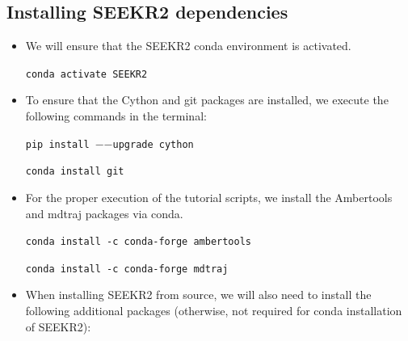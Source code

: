 \documentclass[9pt,training,pubversion]{livecoms}
\begin{document}
\subsection{Installing SEEKR2 dependencies}
\vspace{2mm}

\begin{itemize}

\item We will ensure that the SEEKR2 conda environment is activated.

\begin{tcolorbox}[colback=black!8!white, colframe=black!50!black, fontlower=\tiny, left=2pt, right=2pt, top=2pt, bottom=2pt] 
\texttt{conda activate SEEKR2}
\end{tcolorbox}

\item To ensure that the Cython and git packages are installed, we execute the following commands in the terminal:

\begin{tcolorbox}[colback=black!8!white, colframe=black!50!black, fontlower=\tiny, left=2pt, right=2pt, top=2pt, bottom=2pt] 
\texttt{pip install $-$$-$upgrade cython}
\end{tcolorbox}

\begin{tcolorbox}[colback=black!8!white, colframe=black!50!black, fontlower=\tiny, left=2pt, right=2pt, top=2pt, bottom=2pt] 
\texttt{conda install git}
\end{tcolorbox}

\item For the proper execution of the tutorial scripts, we install the Ambertools and mdtraj packages via conda. 

\begin{tcolorbox}[colback=black!8!white, colframe=black!50!black, fontlower=\tiny, left=2pt, right=2pt, top=2pt, bottom=2pt] 
\texttt{conda install -c conda-forge ambertools}
\end{tcolorbox}

\begin{tcolorbox}[colback=black!8!white, colframe=black!50!black, fontlower=\tiny, left=2pt, right=2pt, top=2pt, bottom=2pt] 
\texttt{conda install -c conda-forge mdtraj}
\end{tcolorbox}

\item When installing SEEKR2 from source, we will also need to install the following additional packages (otherwise, not required for conda installation of SEEKR2):


\end{itemize}
\end{document}
